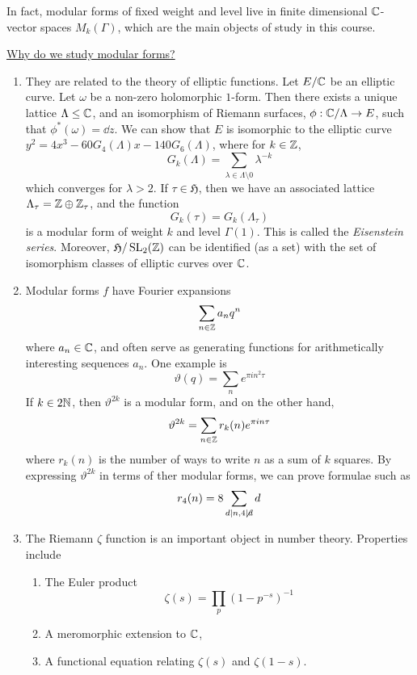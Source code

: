 \documentclass{article}
\newcommand{\mfH}{\mathfrak{H}}
\begin{document}
In fact, modular forms of fixed weight and level live in finite dimensional \(\mathbb{C}\)-vector spaces \(M_k(\Gamma)\), which are the main objects of study in this course.

\underline{Why do we study modular forms?}

\begin{enumerate}
    \item They are related to the theory of elliptic functions. Let \(E/\mathbb{C}\) be an elliptic curve. Let \(\omega\) be a non-zero holomorphic \(1\)-form. Then there exists a unique lattice \(\Lambda \le \mathbb{C}\), and an isomorphism of Riemann surfaces, \(\phi : \mathbb{C}/\Lambda \to E\), such that \(\phi^*(\omega) = \dd z\). We can show that \(E\) is isomorphic to the elliptic curve \(y^2 = 4x^3 - 60 G_4(\Lambda)x - 140 G_6(\Lambda)\), where for \(k \in \mathbb{Z}\),
    \[G_k(\Lambda) = \sum_{\lambda \in \Lambda \setminus 0}\lambda^{-k}\]
    which converges for \(\lambda > 2\). If \(\tau \in \mfH\), then we have an associated lattice \(\Lambda_\tau = \mathbb{Z} \oplus \mathbb{Z}_\tau\), and the function
    \[G_k(\tau) = G_k(\Lambda_\tau)\]
    is a modular form of weight \(k\) and level \(\Gamma(1)\). This is called the \emph{Eisenstein series}. Moreover, \(\mfH/\SL_2(\Z)\) can be identified (as a set) with the set of isomorphism classes of elliptic curves over \(\mathbb{C}\).
    \item Modular forms \(f\) have Fourier expansions
    \[\sum_{n \in \mathbb{Z}}a_n q^n\]
    where \(a_n \in \mathbb{C}\), and often serve as generating functions for arithmetically interesting sequences \(a_n\). One example is
    \[\vartheta(q) = \sum_n e^{\pi i n^2\tau}\]
    If \(k \in 2\mathbb{N}\), then \(\vartheta^{2k}\) is a modular form, and on the other hand,
    \[\vartheta^{2k} = \sum_{n \in \mathbb{Z}}r_k(n)e^{\pi i n\tau}\]
    where \(r_k(n)\) is the number of ways to write \(n\) as a sum of \(k\) squares. By expressing \(\vartheta^{2k}\) in terms of ther modular forms, we can prove formulae such as
    \[r_4(n) = 8\sum_{d \mid n, 4 \not\mid d}d\]
    \item The Riemann \(\zeta\) function is an important object in number theory. Properties include
    \begin{enumerate}
        \item The Euler product
        \[\zeta(s) = \prod_p(1 - p^{-s})^{-1}\]
        \item A meromorphic extension to \(\mathbb{C}\),
        \item A functional equation relating \(\zeta(s)\) and \(\zeta(1-s)\).
    \end{enumerate}

\end{enumerate}
\end{document}
